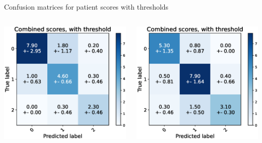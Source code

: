 \begin{frame}[fragile]{Confusion matrices for patient scores with thresholds}
  \begin{columns}[T,onlytextwidth]
      \includegraphics[width=\textwidth]{files/figs/res/trunk/cnf-combined-th.eps}

      \includegraphics[width=\textwidth]{files/figs/res/femval/cnf-combined-th.eps}


\end{columns}
\end{frame}
